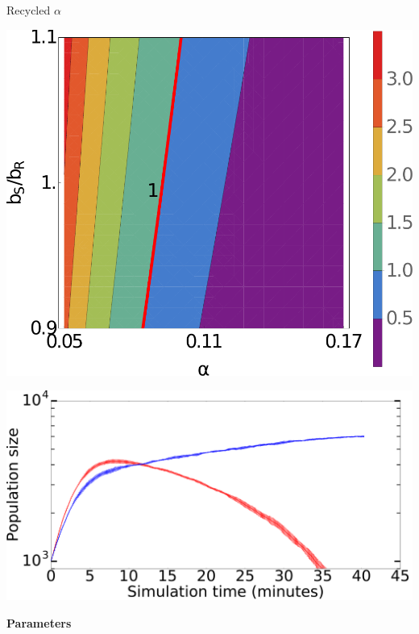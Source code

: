 \documentclass[final]{beamer}
\newlength{\onecolwid}
\newlength{\figwid}
\begin{document}
\begin{frame}[t]
\begin{block}
\begin{columns}[t]
\begin{column}{\onecolwid}
  \begin{block}{Recycled $\alpha$}
    \begin{center}
      \includegraphics[width=\figwid]{../dev/graphics/poster/recycled_contour.pdf}
      \vspace{1.5ex}
        \begin{minipage}[h]{0.6\onecolwid}
        \includegraphics[width=\figwid]{../dev/graphics/poster/recycled_pop.pdf}
      \end{minipage}%
      \begin{minipage}[h]{.3\onecolwid}
        \vfill \textbf{Parameters} \vspace{3mm}\\

\end{minipage}
\end{center}
\end{block}
\end{column}
\end{columns}
\end{block}
\end{frame}
\end{document}
